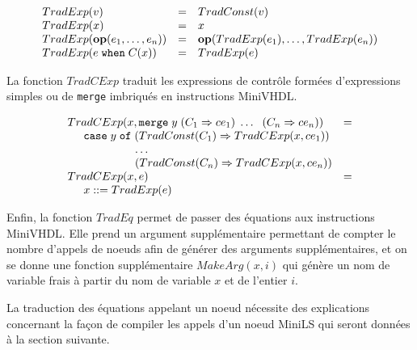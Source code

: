 \documentclass[a4paper]{article}
\newcommand{\mybox}[1]{\mbox{\tt{#1}}}
\newcommand{\ind}[0]{\hspace{0.5cm}}
\newcommand{\coloneqq}[0]{::=}
\newcommand{\Op}[2]{\mybox{\bf{op}}(#1,\dots,#2)}
\newcommand{\When}[3]{#1 \; \mybox{when} \; #2(#3)}
\newcommand{\Merge}[5]{\mybox{merge} \; #1 \; (#2 \Rightarrow #3) \; \dots \; \
  (#4 \Rightarrow #5)}
\newcommand{\Affect}[2]{#1 \coloneqq #2}
\begin{document}
\newcommand{\TradE}[1]{TradExp(#1)}

\[
\begin{array}{lcl}
  \TradE{v} & = & \TradC{v} \\
  \TradE{x} & = & x \\
  \TradE{\Op{e_1}{e_n}} & = & \Op{\TradE{e_1}}{\TradE{e_n}} \\
  \TradE{\When{e}{C}{x}} & = & \TradE{e}
\end{array}
\]

La fonction $TradCExp$ traduit les expressions de contr\^ole form\'ees d'expressions
simples ou de \texttt{merge} imbriqu\'es en instructions MiniVHDL.

\newcommand{\TradCE}[2]{TradCExp(#1, #2)}

\[
\begin{array}{ll}
  \TradCE{x}{\Merge{y}{C_1}{ce_1}{C_n}{ce_n}} & = \\
  \ind \mathtt{case} \; y \; \mathtt{of} \;
  (\TradC{C_1} \Rightarrow \TradCE{x}{ce_1}) \\
  \hspace{2.1cm} \dots \\
  \hspace{2.1cm} (\TradC{C_n} \Rightarrow \TradCE{x}{ce_n}) \\
  \TradCE{x}{e} & = \\
  \ind \Affect{x}{\TradE{e}}
\end{array}
\]

Enfin, la fonction $TradEq$ permet de passer des \'equations aux instructions
MiniVHDL. Elle prend un argument suppl\'ementaire permettant de compter le nombre
d'appels de noeuds afin de g\'en\'erer des arguments suppl\'ementaires, et on se donne
une fonction suppl\'ementaire $MakeArg(x,i)$ qui g\'en\`ere un nom de variable frais \`a
partir du nom de variable $x$ et de l'entier $i$.

La traduction des \'equations appelant un noeud n\'ecessite des explications
concernant la fa\c{c}on de compiler les appels d'un noeud MiniLS qui seront donn\'ees
\`a la section suivante.

\newcommand{\TradEq}[2]{TradEq(#1,#2)}
\newcommand{\MA}[2]{MakeArg(#1,#2)}
\end{document}
